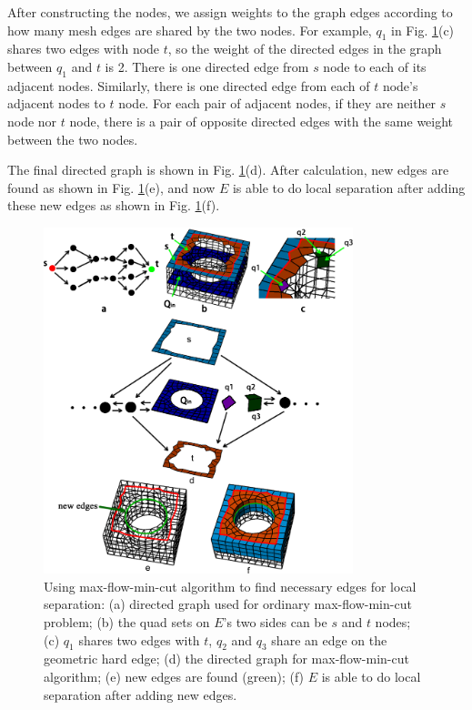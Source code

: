 \documentclass[final,5p,times,twocolumn]{elsarticle}
\begin{document}
After constructing the nodes, we assign weights to the graph edges according to how many mesh edges are shared by the two nodes. For example, $q_1$ in Fig. \ref{fig:max_flow_graph}(c) shares two edges with node $t$, so the weight of the directed edges in the graph between $q_1$ and $t$ is 2. There is one directed edge from $s$ node to each of its adjacent nodes. Similarly, there is one directed edge from each of $t$ node’s adjacent nodes to $t$ node. For each pair of adjacent nodes, if they are neither $s$ node nor $t$ node, there is a pair of opposite directed edges with the same weight between the two nodes.

The final directed graph is shown in Fig. \ref{fig:max_flow_graph}(d). After calculation, new edges are found as shown in Fig. \ref{fig:max_flow_graph}(e), and now $E$ is able to do local separation after adding these new edges as shown in  Fig. \ref{fig:max_flow_graph}(f).

\begin{figure}[htbp]
\begin{center}
\includegraphics[width=9cm]{figures/max_flow_graph.png}
\caption{Using max-flow-min-cut algorithm to find necessary edges for local separation: (a) directed graph used for ordinary max-flow-min-cut problem; (b) the quad sets on $E$'s two sides can be $s$ and $t$ nodes; (c) $q_1$ shares two edges with $t$, $q_2$ and $q_3$ share an edge on the geometric hard edge; (d) the directed graph for max-flow-min-cut algorithm; (e) new edges are found (green); (f) $E$ is able to do local separation after adding new edges.}
\label{fig:max_flow_graph}
\end{center}
\end{figure}
\end{document}
